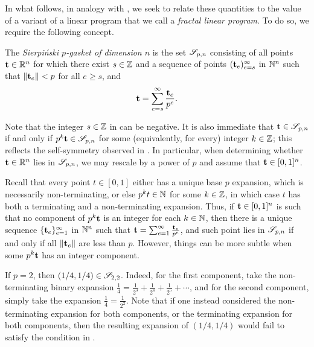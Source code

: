 \documentclass[11pt]{amsart}
\begin{document}
In what follows, in analogy with , we seek to relate these quantities to the value of a variant of a linear program that we call a \emph{fractal linear program}.  To do so, we require the following concept.

\begin{definition}
\label{sierpinski: D}
   The \emph{Sierpi\'nski $p$-gasket of dimension $n$} is the set $\mathscr{S}_{p,n}$ consisting of all points $\mathbf{t}\in \mathbb{R}^n$ for which there exist $s \in \mathbb{Z}$ and a sequence of points $( \mathbf{t}_e )_{e=s}^\infty$ in $\mathbb{N}^n$ such that $\| \mathbf{t}_e \| < p$ for all $e \geq s$, and
 \[
\mathbf{t} = \sum_{e=s}^{\infty} \frac{\mathbf{t}_e}{p^e}.
 \]
\end{definition}

Note that the integer $s \in \mathbb{Z}$ in  can be negative.
It is also immediate that $\mathbf{t} \in \mathscr{S}_{p,n}$ if and only if $p^k  \mathbf{t} \in \mathscr{S}_{p,n}$ for some (equivalently, for every) integer $k \in \mathbb{Z}$; this reflects the self-symmetry observed in .
In particular, when determining whether $\mathbf{t} \in \mathbb{R}^n$ lies in $\mathscr{S}_{p,n}$, we may rescale by a power of $p$  and assume that $\mathbf{t} \in [0,1]^n$.

Recall that every point $t \in [0,1]$ either has a unique base $p$ expansion, which is necessarily non-terminating, or else $p^k t \in \mathbb{N}$ for some $k \in \mathbb{Z}$, in which case $t$ has both a terminating and a non-terminating expansion.
Thus, if $\mathbf{t} \in [0,1]^n$ is such that no component of $p^k \mathbf{t}$ is an integer for each $k \in \mathbb{N}$, then there is a unique sequence $\{ \mathbf{t}_e \}_{e=1}^{\infty}$ in $ \mathbb{N}^n$ such that $\mathbf{t} = \sum_{e=1}^{\infty} \frac{\mathbf{t}_e}{p^e}$, and such point lies in ${\mathscr{S}}_{p,n}$ if and only if all $\| \mathbf{t}_e \|$ are less than $p$.
However, things can be more subtle when some $p^k \mathbf{t}$ has an integer component.

\begin{example}
If $p=2$, then $(1/4, 1/4) \in \mathscr{S}_{2,2}$.  Indeed, for the first component, take the non-terminating binary expansion $\frac{1}{4} = \frac{1}{2^3} + \frac{1}{2^4} + \frac{1}{2^5} + \cdots$, and for the second component, simply take the expansion $\frac{1}{4} = \frac{1}{2^2}$.  Note that if one instead considered the non-terminating expansion for both components, or the terminating expansion for both components, then the resulting expansion of $(1/4, 1/4)$ would fail to satisfy the condition in .
\end{example}
\end{document}
